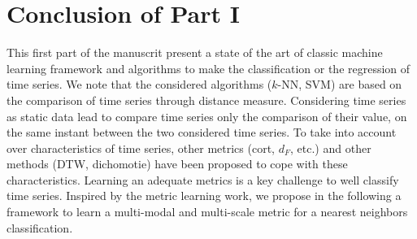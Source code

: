 \part*{Conclusion of Part I}
This first part of the manuscrit present a state of the art of classic machine learning framework and algorithms to make the classification or the regression of time series. We note that the considered algorithms ($k$-NN, SVM) are based on the comparison of time series through distance measure. Considering time series as static data lead to compare time series only the comparison of their value, on the same instant between the two considered time series. To take into account over characteristics of time series, other metrics (cort, $d_F$, etc.) and other methods (DTW, dichomotie)  have been proposed to cope with these characteristics. Learning an adequate metrics is a key challenge to well classify time series. Inspired by the metric learning work, we propose in the following a framework to learn a multi-modal and multi-scale metric for a nearest neighbors classification.